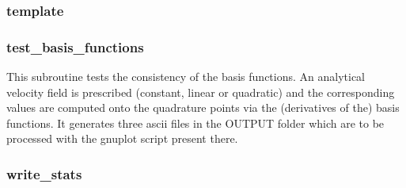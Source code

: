  \subsubsection{template}

 \subsubsection{test\_basis\_functions}
 This subroutine tests the consistency of the basis functions. 
 An analytical velocity field is prescribed (constant, linear or quadratic) and the 
 corresponding values are computed onto the quadrature points via the 
 (derivatives of the) basis functions.
 It generates three ascii files in the {\foldernamefont OUTPUT} folder which 
 are to be processed with the gnuplot script present there.
 \subsubsection{write\_stats}

